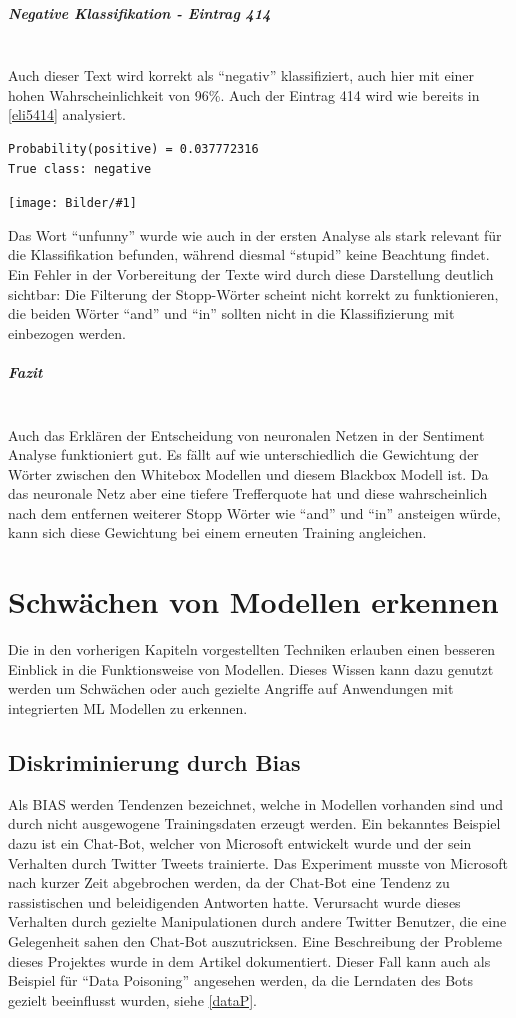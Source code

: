 \documentclass[
  12pt, %
  a4paper, %
  oneside, %
  openany, 
  numbers=noenddot, %
  BCOR=5mm, %
  parskip=half*, %
  thesis, %
]{bfhbook}
\newcommand{\parag}[1]{\paragraph*{#1}\mbox{}\\}
\newcommand{\imgText}[3]{
\begin{center}
    \begin{minipage}[t]{0.6\textwidth}
    		\vspace{0pt}
		\texttt{[image: Bilder/\#1]}
		\captionof{figure}{#2}
	\end{minipage}\hfill
    \begin{minipage}[t]{0.4\textwidth}
    		\vspace{5pt}
  		#3
    \end{minipage}
\end{center}
}
\begin{document}
\parag{Negative Klassifikation - Eintrag 414}
Auch dieser Text wird korrekt als ``negativ'' klassifiziert, auch hier mit einer hohen Wahrscheinlichkeit von 96\%.
Auch der Eintrag 414 wird wie bereits in \ref{eli5414} analysiert.
\begin{lstlisting}
Probability(positive) = 0.037772316
True class: negative
\end{lstlisting}
\imgText{MovieReview-LSTM-Display-414.PNG}{Visualisierung Movie Review 414}{
Das Wort ``unfunny'' wurde wie auch in der ersten Analyse als stark relevant für die Klassifikation befunden, während diesmal ``stupid'' keine Beachtung findet. Ein Fehler in der Vorbereitung der Texte wird durch diese Darstellung deutlich sichtbar: Die Filterung der Stopp-Wörter scheint nicht korrekt zu funktionieren, die beiden Wörter ``and'' und ``in'' sollten nicht in die Klassifizierung mit einbezogen werden.
}

\parag{Fazit}
Auch das Erklären der Entscheidung von neuronalen Netzen in der Sentiment Analyse funktioniert gut. Es fällt auf wie unterschiedlich die Gewichtung der Wörter zwischen den Whitebox Modellen und diesem Blackbox Modell ist. Da das neuronale Netz aber eine tiefere Trefferquote hat und diese wahrscheinlich nach dem entfernen weiterer Stopp Wörter wie ``and'' und ``in'' ansteigen würde, kann sich diese Gewichtung bei einem erneuten Training angleichen.

\chapter{Schwächen von Modellen erkennen}
\label{vulnearabilities}

Die in den vorherigen Kapiteln vorgestellten Techniken erlauben einen besseren Einblick in die Funktionsweise von  Modellen. Dieses Wissen kann dazu genutzt werden um Schwächen oder auch gezielte Angriffe auf Anwendungen mit integrierten \Gls{ML} Modellen zu erkennen.

\section{Diskriminierung durch Bias}
Als \Gls{BIAS} werden Tendenzen bezeichnet, welche in Modellen vorhanden sind und durch nicht ausgewogene Trainingsdaten erzeugt werden.
Ein bekanntes Beispiel dazu ist ein Chat-Bot, welcher von Microsoft entwickelt wurde und der sein Verhalten durch Twitter Tweets trainierte. Das Experiment musste von Microsoft nach kurzer Zeit abgebrochen werden, da der Chat-Bot eine Tendenz zu rassistischen und beleidigenden Antworten hatte. Verursacht wurde dieses Verhalten durch gezielte Manipulationen durch andere Twitter Benutzer, die eine Gelegenheit sahen den Chat-Bot auszutricksen. Eine Beschreibung der Probleme dieses Projektes wurde in dem Artikel \parencite{msTay} dokumentiert.
Dieser Fall kann auch als Beispiel für ``Data Poisoning'' angesehen werden, da die Lerndaten des Bots gezielt beeinflusst wurden, siehe \ref{dataP}.
\end{document}
